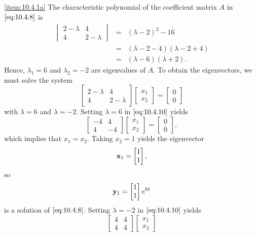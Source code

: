 \documentclass{ximera}
\begin{document}
\begin{example}
\begin{explanation}
\ref{item:10.4.1a}  The characteristic
polynomial of the  coefficient matrix $A$ in  $\eqref{eq:10.4.8}$ is
\begin{eqnarray*}
\begin{vmatrix} 2-\lambda&4\\4&2-\lambda\end{vmatrix}
&=& (\lambda-2)^2-16\\
&=& (\lambda-2-4)(\lambda-2+4)\\
&=& (\lambda-6)(\lambda+2).
\end{eqnarray*}
Hence,  $\lambda_1=6$ and $\lambda_2
=-2$ are eigenvalues of $A$. To obtain the eigenvectors,
we must solve the system
\begin{equation}\label{eq:10.4.10}
\begin{bmatrix} 2-\lambda&4\\4&2-\lambda\end{bmatrix}
\begin{bmatrix} x_1\\x_2\end{bmatrix}=
\begin{bmatrix} 0\\0\end{bmatrix}
\end{equation}
with $\lambda=6$ and $\lambda=-2$.  Setting $\lambda=6$ in
$\eqref{eq:10.4.10}$ yields
 $$
\begin{bmatrix}-4&4\\4&-4
\end{bmatrix}\begin{bmatrix}
x_1\\x_2\end{bmatrix}=\begin{bmatrix} 0\\0\end{bmatrix},
$$
which implies that $x_1=x_2$.  Taking $x_2=1$ yields the eigenvector
$$
{\bf x}_1=\begin{bmatrix} 1\\1\end{bmatrix},
$$
so
$$
{\bf y}_1=\begin{bmatrix} 1\\1\end{bmatrix}e^{6t}
$$
is a solution of  $\eqref{eq:10.4.8}$.  Setting $\lambda=-2$ in
$\eqref{eq:10.4.10}$ yields
 $$
\begin{bmatrix} 4&4\\4&4\end{bmatrix}
\begin{bmatrix} x_1\\x_2

\end{bmatrix}$$
\end{explanation}
\end{example}
\end{document}
